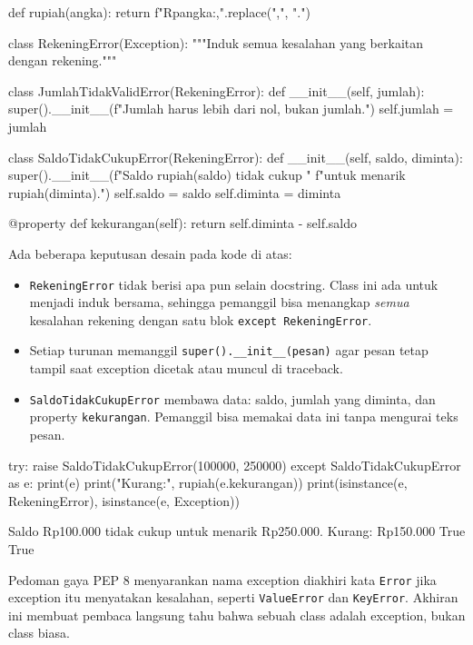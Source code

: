 \begin{kode}
def rupiah(angka):
    return f"Rp{angka:,}".replace(",", ".")

class RekeningError(Exception):
    """Induk semua kesalahan yang berkaitan dengan rekening."""

class JumlahTidakValidError(RekeningError):
    def __init__(self, jumlah):
        super().__init__(f"Jumlah harus lebih dari nol, bukan {jumlah}.")
        self.jumlah = jumlah

class SaldoTidakCukupError(RekeningError):
    def __init__(self, saldo, diminta):
        super().__init__(f"Saldo {rupiah(saldo)} tidak cukup "
                         f"untuk menarik {rupiah(diminta)}.")
        self.saldo = saldo
        self.diminta = diminta

    @property
    def kekurangan(self):
        return self.diminta - self.saldo
\end{kode}

Ada beberapa keputusan desain pada kode di atas:

\begin{itemize}
  \item \texttt{RekeningError} tidak berisi apa pun selain docstring. Class ini ada untuk menjadi induk bersama, sehingga pemanggil bisa menangkap \emph{semua} kesalahan rekening dengan satu blok \texttt{except RekeningError}.
  \item Setiap turunan memanggil \texttt{super().\_\_init\_\_(pesan)} agar pesan tetap tampil saat exception dicetak atau muncul di traceback.
  \item \texttt{SaldoTidakCukupError} membawa data: saldo, jumlah yang diminta, dan property \texttt{kekurangan}. Pemanggil bisa memakai data ini tanpa mengurai teks pesan.
\end{itemize}

\begin{kode}
try:
    raise SaldoTidakCukupError(100000, 250000)
except SaldoTidakCukupError as e:
    print(e)
    print("Kurang:", rupiah(e.kekurangan))
    print(isinstance(e, RekeningError), isinstance(e, Exception))
\end{kode}

\begin{keluaran}
Saldo Rp100.000 tidak cukup untuk menarik Rp250.000.
Kurang: Rp150.000
True True
\end{keluaran}

\begin{info}
Pedoman gaya PEP 8 menyarankan nama exception diakhiri kata \texttt{Error} jika exception itu menyatakan kesalahan, seperti \texttt{ValueError} dan \texttt{KeyError}. Akhiran ini membuat pembaca langsung tahu bahwa sebuah class adalah exception, bukan class biasa.
\end{info}


